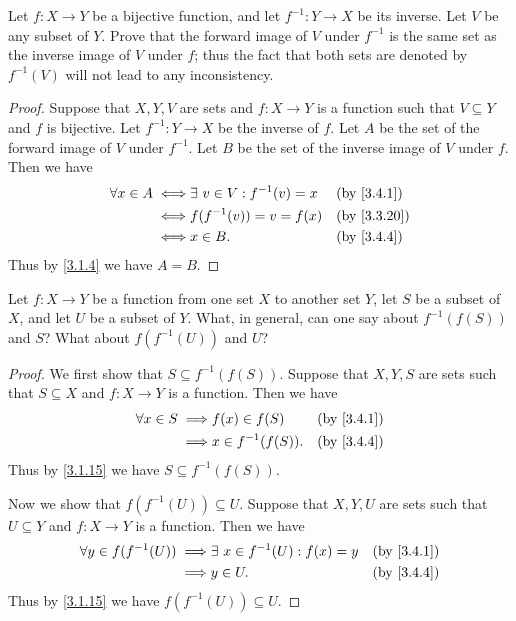 \exercisesection

\begin{ex}\label{ex:3.4.1}
  Let \(f : X \to Y\) be a bijective function, and let \(f^{-1} : Y \to X\) be its inverse.
  Let \(V\) be any subset of \(Y\).
  Prove that the forward image of \(V\) under \(f^{-1}\) is the same set as the inverse image of \(V\) under \(f\);
  thus the fact that both sets are denoted by \(f^{-1}(V)\) will not lead to any inconsistency.
\end{ex}

\begin{proof}
  Suppose that \(X, Y, V\) are sets and \(f : X \to Y\) is a function such that \(V \subseteq Y\) and \(f\) is bijective.
  Let \(f^{-1} : Y \to X\) be the inverse of \(f\).
  Let \(A\) be the set of the forward image of \(V\) under \(f^{-1}\).
  Let \(B\) be the set of the inverse image of \(V\) under \(f\).
  Then we have
  \begin{align*}
    \forall x \in A \iff & \exists\ v \in V : f^{-1}(v) = x &  & \text{(by \cref{3.4.1})}  \\
    \iff                 & f(f^{-1}(v)) = v = f(x)          &  & \text{(by \cref{3.3.20})} \\
    \iff                 & x \in B.                         &  & \text{(by \cref{3.4.4})}
  \end{align*}
  Thus by \cref{3.1.4} we have \(A = B\).
\end{proof}

\begin{ex}\label{ex:3.4.2}
  Let \(f : X \to Y\) be a function from one set \(X\) to another set \(Y\), let \(S\) be a subset of \(X\), and let \(U\) be a subset of \(Y\).
  What, in general, can one say about \(f^{-1}(f(S))\) and \(S\)?
  What about \(f(f^{-1}(U))\) and \(U\)?
\end{ex}

\begin{proof}
  We first show that \(S \subseteq f^{-1}(f(S))\).
  Suppose that \(X, Y, S\) are sets such that \(S \subseteq X\) and \(f : X \to Y\) is a function.
  Then we have
  \begin{align*}
    \forall x \in S \implies & f(x) \in f(S)       &  & \text{(by \cref{3.4.1})} \\
    \implies                 & x \in f^{-1}(f(S)). &  & \text{(by \cref{3.4.4})}
  \end{align*}
  Thus by \cref{3.1.15} we have \(S \subseteq f^{-1}(f(S))\).

  Now we show that \(f(f^{-1}(U)) \subseteq U\).
  Suppose that \(X, Y, U\) are sets such that \(U \subseteq Y\) and \(f : X \to Y\) is a function.
  Then we have
  \begin{align*}
    \forall y \in f(f^{-1}(U)) \implies & \exists\ x \in f^{-1}(U) : f(x) = y &  & \text{(by \cref{3.4.1})} \\
    \implies                            & y \in U.                            &  & \text{(by \cref{3.4.4})}
  \end{align*}
  Thus by \cref{3.1.15} we have \(f(f^{-1}(U)) \subseteq U\).
\end{proof}

